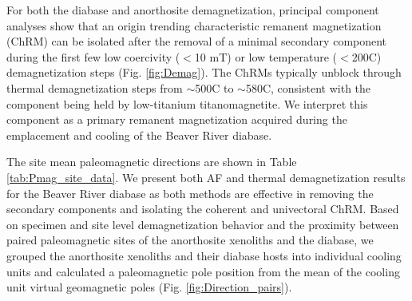 \documentclass[draft]{agujournal2019}
\begin{document}
For both the diabase and anorthosite demagnetization, principal component analyses show that an origin trending characteristic remanent magnetization (ChRM) can be isolated after the removal of a minimal secondary component during the first few low coercivity ($<$10 mT) or low temperature ($<$200\textdegree C) demagnetization steps (Fig. \ref{fig:Demag}). The ChRMs typically unblock through thermal demagnetization steps from $\sim$500\textdegree C to $\sim$580\textdegree C, consistent with the component being held by low-titanium titanomagnetite. We interpret this component as a primary remanent magnetization acquired during the emplacement and cooling of the Beaver River diabase.

The site mean paleomagnetic directions are shown in Table \ref{tab:Pmag_site_data}. We present both AF and thermal demagnetization results for the Beaver River diabase as both methods are effective in removing the secondary components and isolating the coherent and univectoral ChRM. Based on specimen and site level demagnetization behavior and the proximity between paired paleomagnetic sites of the anorthosite xenoliths and the diabase, we grouped the anorthosite xenoliths and their diabase hosts into individual cooling units and calculated a paleomagnetic pole position from the mean of the cooling unit virtual geomagnetic poles (Fig. \ref{fig:Direction_pairs}). 
\end{document}
